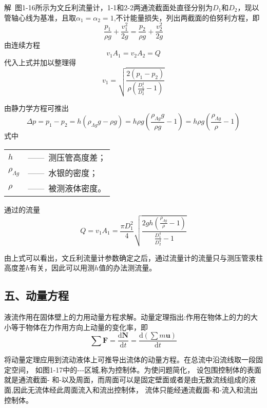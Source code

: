 解\ 图1-16所示为文丘利流量计，1-1和2-2两通流截面处直径分别为$D_1$和$D_2$，现以管轴心线为基准，且取$\alpha_1=\alpha_2=1$,不计能量损失，列出两截面的伯努利方程，即
\begin{equation*}
    \frac{p_1}{\rho g}+\frac{v_1^2}{2g}=\frac{p_2}{\rho g}+\frac{v_2^2}{2g}
\end{equation*}
由连续方程
\begin{equation*}
  v_1A_1=v_2A_2=Q
  \end{equation*}
代入上式并加以整理得
\begin{equation*}
  v_1=\sqrt{\frac{2(p_1-p_2)}{\rho(\frac{D_1^4}{D_2^4}-1)}}
  \end{equation*}

  由静力学方程可推出
  \begin{equation*}
   \Delta p=p_1-p_2=h(\rho_{\Lambda g} g-\rho g)=h\rho g(\frac{\rho_{\Lambda g} g}{\rho g}-1)=h\rho g(\frac{\rho_{\Lambda g}}{\rho}-1)
    \end{equation*}
\noindent 式中\
\begin{tabular}[t]{ll}
$h$ &——\ 测压管高度差；\\
$\rho_{\Lambda g}$ &——\ 水银的密度；\\
$\rho$ &——\ 被测液体密度。
\end{tabular}

通过的流量
\begin{equation*}
Q=v_1A_1=\frac{\pi D_1^2}{4}\sqrt{\frac{2gh(\frac{\rho_{\Lambda g}}{\rho}-1)}{\frac{D_1^4}{D_2^4}-1}}
\end{equation*}

由上式可以看出，文丘利流量计参数确定之后，通过流量计的流量只与测压管汞柱高度差$h$有关，因此可以用测$h$值的办法测流量。
\subsection*{五、动量方程}
液流作用在固体壁上的力用动量方程求解。动量定理指出:作用在物体上的力的大小等于物体在力作用方向上动量的变化率，即
\begin{equation*}
\sum\boldsymbol F=\frac{\mathrm{d}\boldsymbol N}{\mathrm{d}t}=\frac{\mathrm{d}(\sum m \boldsymbol u)}{\mathrm{d}t}
\end{equation*}

将动量定理应用到流动液体上可推导出流体的动量方程。在总流中沿流线取一段固定空间，
如图1-17中的\uppercase\expandafter{}-\uppercase\expandafter{}-\uppercase\expandafter{}-\uppercase\expandafter{}区城,称为控制体。为使问题简化，
设包围控制体的表面就是通流截面\uppercase\expandafter{\romannumeral1}-\uppercase\expandafter{}
和\uppercase\expandafter{}-\uppercase\expandafter{}以及周面，而周面可以是固定壁面或者是由无数流线组成的液面,因此无流体经此周面流入和流出控制体，
流体只能经通流截面\uppercase\expandafter{\romannumeral1}-\uppercase\expandafter{\romannumeral1}和\uppercase\expandafter{}-\uppercase\expandafter{\romannumeral2}流入和流出控制体。

